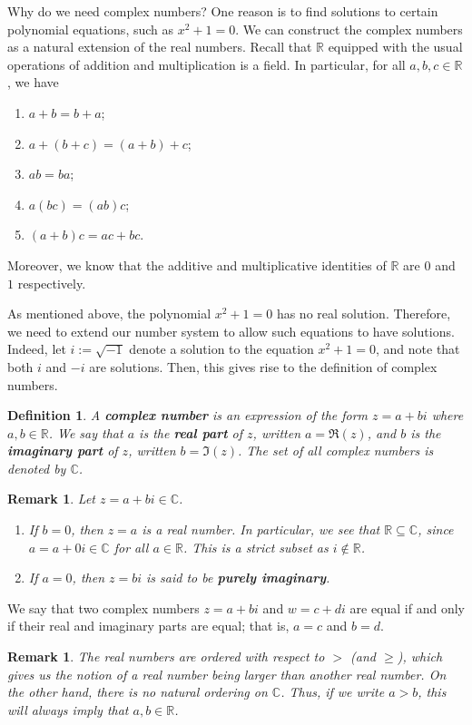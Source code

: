 \documentclass[10pt]{article}
\newcommand{\R}{\mathbb{R}}
\newcommand{\C}{\mathbb{C}}
\theoremstyle{newstyle}
\newtheorem{remark}[thm]{Remark}
\newtheorem{defn}[thm]{Definition}
\begin{document}
Why do we need complex numbers? One reason is to find solutions to certain polynomial equations, 
such as $x^2 + 1 = 0$. We can construct the  complex numbers as a natural extension of the 
real numbers. Recall that $\R$ equipped with the usual operations of addition and 
multiplication is a field. In particular, for all $a, b, c \in \R$, we have 
\begin{enumerate}[(1)]
    \item $a+b=b+a$;
    \item $a+(b+c)=(a+b)+c$;
    \item $ab=ba$;
    \item $a(bc) = (ab)c$;
    \item $(a+b)c = ac +bc$.
\end{enumerate}
Moreover, we know that the additive and multiplicative identities of $\R$ are $0$ and $1$ respectively.

As mentioned above, the polynomial $x^2 + 1 = 0$ has no real solution. Therefore, we need to 
extend our number system to allow such equations to have solutions. 
Indeed, let $i := \sqrt{-1}$ denote a solution to the equation $x^2 + 1 = 0$, and 
note that both $i$ and $-i$ are solutions. Then, this gives rise to the definition of complex numbers. 

\begin{defn}
A {\bf complex number} is an expression of the form $z = a+bi$ where $a,b \in \R$. 
We say that $a$ is the {\bf real part} of $z$, written $a = \Re(z)$, and $b$ 
is the {\bf imaginary part} of $z$, written $b = \Im(z)$. The set of all complex numbers 
is denoted by $\C$. 
\end{defn}

\begin{remark}
Let $z = a+bi \in \C$.
\begin{enumerate}[(1)]
    \item If $b = 0$, then $z = a$ is a real number. In particular, we see that 
    $\R \subseteq \C$, since $a = a+0i \in \C$ for all $a \in \R$. This 
    is a strict subset as $i \notin \R$. 
    \item If $a = 0$, then $z = bi$ is said to be {\bf purely imaginary}. 
\end{enumerate}
\end{remark}

We say that two complex numbers $z = a + bi$ and $w = c+di$ are equal if and only if 
their real and imaginary parts are equal; that is, $a = c$ and $b = d$. 

\begin{remark}
The real numbers are ordered with respect to $>$ (and $\geq$), which gives us the notion of 
a real number being larger than another real number. 
On the other hand, there is no natural ordering on $\C$. Thus, if we write $a > b$, 
this will always imply that $a, b \in \R$.
\end{remark}
\end{document}
